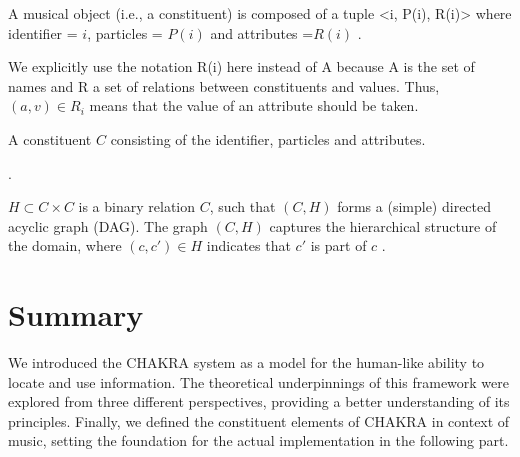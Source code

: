 \begin{definition}[Constituent]
\label{def:constituent}
 A musical object (i.e., a constituent) is composed of a tuple <i, P(i), R(i)> where identifier = $i$, particles = $P(i)$ and attributes =$R(i)$ \parencite[p. 112]{harley_abstract_2020}.
 \end{definition}
We explicitly use the notation R(i) here instead of A because A is the set of names and R a set of relations between constituents and values. Thus, $(a,v) \in R_i$ means that the value of an attribute should be taken.
 
\begin{marginfigure}
\centering

\vspace{0.2cm}
\caption{A constituent $C$ consisting of the identifier, particles and attributes.}.
\label{hierarchy} 
\end{marginfigure}


\begin{definition}[Hierarchy]
\label{Hierarchy}
$H \subset C \times C$ is a binary relation $C$, such that $(C, H)$ forms a (simple) directed acyclic graph (DAG).  The graph $(C,H)$ captures the hierarchical structure of the domain, where $(c, c') \in H$ indicates that $c'$ is part of $c$ \parencite[p. 111]{harley_abstract_2020}.
\end{definition}

 
\section{Summary}
We introduced the CHAKRA system as a model for the human-like ability to locate and use information. The theoretical underpinnings of this framework were explored from three different perspectives, providing a better understanding of its principles. Finally, we defined the constituent elements of CHAKRA in context of music, setting the foundation for the actual implementation in the following part.

